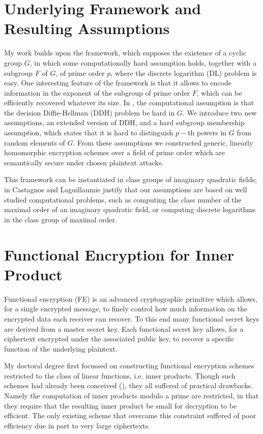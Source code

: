 \documentclass[11pt]{llncs}
\begin{document}
\section{Underlying Framework and Resulting Assumptions}\label{section:framework}
My work builds upon the \cite{RSA:CasLag15} framework, which supposes the existence of a cyclic group $G$, in which some computationally hard assumption holds, together with a subgroup $F$ of $G$, of prime order $p$, where the discrete logarithm (DL) problem is easy.
%
One interesting feature of the framework is that it allows to encode information in the exponent of the subgroup of prime order $F$, which can be efficiently recovered whatever its size.
%
In \cite{RSA:CasLag15}, the computational assumption is that the decision Diffie-Hellman (DDH) problem be hard in $G$. We introduce two new assumptions, an extended version of DDH,  and a hard subgroup membership assumption, which states that it is hard to distinguish $p-$th powers in $G$ from random elements of $G$.
From these assumptions we constructed generic, linearly homomorphic encryption schemes over a field of prime order which are semantically secure under chosen plaintext attacks.

This framework can be instantiated in class groups of imaginary quadratic fields; in \cite{RSA:CasLag15} Castagnos and Laguillaumie justify that our assumptions are based on well studied computational problems, such as computing the class number of the maximal order of an imaginary quadratic field, or computing discrete logarithms in the class group of maximal order.


\section{Functional Encryption for Inner Product}
Functional encryption (FE) is an advanced cryptographic primitive which allows, for a single encrypted message, to finely control how much information on the encrypted data each receiver can recover. To this end many functional secret keys are derived from a master secret key. Each functional secret key allows, for a ciphertext encrypted under the associated public key, to recover a specific function of the underlying plaintext. 

My doctoral degree first focussed on constructing functional encryption schemes restricted to the class of linear functions, i.e. inner products. Though such schemes had already been conceived (\cite{PKC:ABDP15,EPRINT:ABCP16,C:AgrLibSte16}), they all suffered of practical drawbacks. Namely the computation of inner products modulo a prime are restricted, in that they require that the resulting inner product be small for decryption to be efficient. The only existing scheme that overcame this constraint suffered of poor efficiency due in part to very large ciphertexts.
\end{document}
